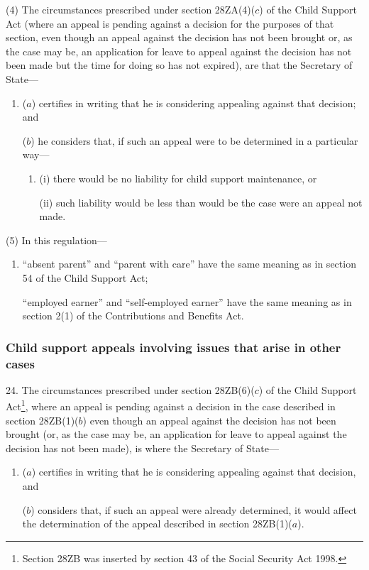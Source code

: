 \documentclass[12pt,a4paper]{article}
\begin{document}
(4) The circumstances prescribed under section 28ZA(4)($c$) of the Child Support Act (where an appeal is pending against a decision for the purposes of that section, even though an appeal against the decision has not been brought or, as the case may be, an application for leave to appeal against the decision has not been made but the time for doing so has not expired), are that the Secretary of State—
\begin{enumerate}\item[]
($a$) certifies in writing that he is considering appealing against that decision; and

($b$) he considers that, if such an appeal were to be determined in a particular way—
\begin{enumerate}\item[]
(i) there would be no liability for child support maintenance, or

(ii) such liability would be less than would be the case were an appeal not made.
\end{enumerate}
\end{enumerate}

(5) In this regulation—
\begin{enumerate}\item[]
“absent parent” and “parent with care” have the same meaning as in section 54 of the Child Support Act;

“employed earner” and “self-employed earner” have the same meaning as in section 2(1) of the Contributions and Benefits Act.
\end{enumerate}

\subsubsection[24. Child support appeals involving issues that arise in other cases]{Child support appeals involving issues that arise in other cases}

24.  The circumstances prescribed under section 28ZB(6)($c$) of the Child Support Act\footnote{\frenchspacing Section 28ZB was inserted by section 43 of the Social Security Act 1998.}, where an appeal is pending against a decision in the case described in section 28ZB(1)($b$) even though an appeal against the decision has not been brought (or, as the case may be, an application for leave to appeal against the decision has not been made), is where the Secretary of State—
\begin{enumerate}\item[]
($a$) certifies in writing that he is considering appealing against that decision, and

($b$) considers that, if such an appeal were already determined, it would affect the determination of the appeal described in section 28ZB(1)($a$).
\end{enumerate}
\end{document}
